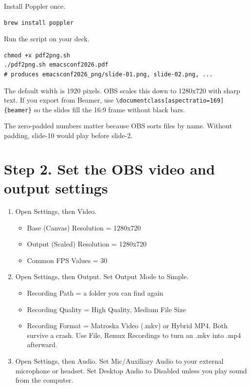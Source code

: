 \documentclass[11pt]{article}
\begin{document}
Install Poppler once.

\begin{verbatim}
brew install poppler
\end{verbatim}

Run the script on your deck.

\begin{verbatim}
chmod +x pdf2png.sh
./pdf2png.sh emacsconf2026.pdf
# produces emacsconf2026_png/slide-01.png, slide-02.png, ...
\end{verbatim}

The default width is 1920 pixels. OBS scales this down to 1280x720 with sharp text. If you export from Beamer, use \texttt{\textbackslash{}documentclass[aspectratio=169]\{beamer\}} so the slides fill the 16:9 frame without black bars.

The zero-padded numbers matter because OBS sorts files by name. Without padding, slide-10 would play before slide-2.
\section*{Step 2. Set the OBS video and output settings}
\label{sec:orgeca7086}

\begin{enumerate}
\item Open Settings, then Video.
\begin{itemize}
\item Base (Canvas) Resolution = 1280x720
\item Output (Scaled) Resolution = 1280x720
\item Common FPS Values = 30
\end{itemize}
\item Open Settings, then Output. Set Output Mode to Simple.
\begin{itemize}
\item Recording Path = a folder you can find again
\item Recording Quality = High Quality, Medium File Size
\item Recording Format = Matroska Video (.mkv) or Hybrid MP4. Both survive a crash. Use File, Remux Recordings to turn an .mkv into .mp4 afterward.
\end{itemize}
\item Open Settings, then Audio. Set Mic/Auxiliary Audio to your external microphone or headset. Set Desktop Audio to Disabled unless you play sound from the computer.
\end{enumerate}
\end{document}
